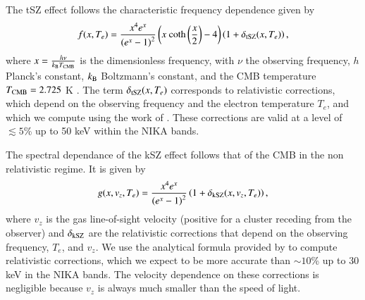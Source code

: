 \documentclass[twocolumn,traditabstract]{aa}
\begin{document}
The tSZ effect follows the characteristic frequency dependence given by \citep{birkinshaw1999}
\begin{equation}
	f(x,T_e) = \frac{x^4 e^x}{\left(e^x - 1\right)^2} \left(x \ {\rm coth} \left(\frac{x}{2}\right) - 4\right) \left(1+\delta_{\rm tSZ}(x,T_e) \right),
\label{eq:f_x_tsz}
\end{equation}
where $x=\frac{h \nu}{k_{\rm B} T_{\rm CMB}}$ is the dimensionless frequency, with $\nu$ the observing frequency, $h$ Planck's constant, $k_{\rm B}$ Boltzmann's constant, and the CMB temperature $T_{\rm CMB} = 2.725$ K \citep{Fixsen2009}. The term $\delta_{\rm tSZ}(x,T_e)$ corresponds to relativistic corrections, which depend on the observing frequency and the electron temperature $T_e$, and which we compute using the work of \cite{Itoh2003}. These corrections are valid at a level of $\lesssim 5$\% up to 50 keV within the NIKA bands.

The spectral dependance of the kSZ effect follows that of the CMB in the non relativistic regime. It is given by \citep{birkinshaw1999}
\begin{equation}
	g(x, v_z, T_e) = \frac{x^4 e^x}{\left(e^x - 1\right)^2} \left(1+\delta_{\rm kSZ}(x,v_z,T_e) \right),
\label{eq:g_x_ksz}
\end{equation}
where $v_z$ is the gas line-of-sight velocity (positive for a cluster receding from the observer) and $\delta_{\rm kSZ}$ are the relativistic corrections that depend on the observing frequency, $T_e$, and $v_z$. We use the analytical formula provided by \cite{Nozawa2006} to compute relativistic corrections, which we expect to be more accurate than $\sim 10$\% up to 30 keV in the NIKA bands. The velocity dependence on these corrections is negligible because $v_z$ is always much smaller than the speed of light.
\end{document}
